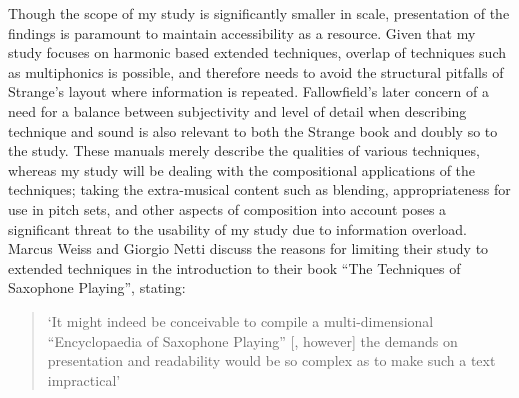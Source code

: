 Though the scope of my study is significantly smaller in scale, presentation of the findings is paramount to maintain accessibility as a resource. Given that my study focuses on harmonic based extended techniques, overlap of techniques such as multiphonics is possible, and therefore needs to avoid the structural pitfalls of Strange’s layout where information is repeated. Fallowfield’s later concern of a need for a balance between subjectivity and level of detail when describing technique and sound is also relevant to both the Strange book and doubly so to the study. These manuals merely describe the qualities of various techniques, whereas my study will be dealing with the compositional applications of the techniques; taking the extra-musical content such as blending, appropriateness for use in pitch sets, and other aspects of composition into account poses a significant threat to the usability of my study due to information overload. Marcus Weiss and Giorgio Netti discuss the reasons for limiting their study to extended techniques in the introduction to their book “The Techniques of Saxophone Playing”, stating:
\begin{quotation}
    ‘It might indeed be conceivable to compile a multi-dimensional “Encyclopaedia of Saxophone Playing” [, however] the demands on presentation and readability would be so complex as to make such a text impractical’\autocite[Introduction]{weissTechniquesSaxophonePlaying2010}
\end{quotation}

